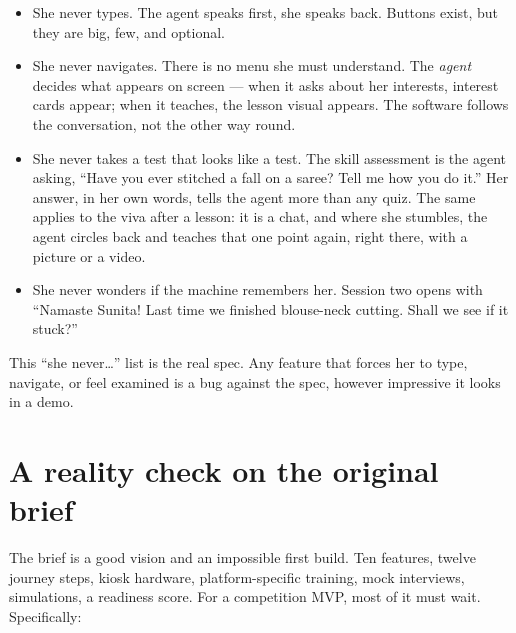 \documentclass[11pt]{article}
\begin{document}
\begin{itemize}
  \item She never types. The agent speaks first, she speaks back. Buttons exist, but they are big, few, and optional.
  \item She never navigates. There is no menu she must understand. The \emph{agent} decides what appears on screen --- when it asks about her interests, interest cards appear; when it teaches, the lesson visual appears. The software follows the conversation, not the other way round.
  \item She never takes a test that looks like a test. The skill assessment is the agent asking, ``Have you ever stitched a fall on a saree? Tell me how you do it.'' Her answer, in her own words, tells the agent more than any quiz. The same applies to the viva after a lesson: it is a chat, and where she stumbles, the agent circles back and teaches that one point again, right there, with a picture or a video.
  \item She never wonders if the machine remembers her. Session two opens with ``Namaste Sunita! Last time we finished blouse-neck cutting. Shall we see if it stuck?''
\end{itemize}

This ``she never\ldots'' list is the real spec. Any feature that forces her to type, navigate, or feel examined is a bug against the spec, however impressive it looks in a demo.

\section{A reality check on the original brief}

The brief is a good vision and an impossible first build. Ten features, twelve journey steps, kiosk hardware, platform-specific training, mock interviews, simulations, a readiness score. For a competition MVP, most of it must wait. Specifically:
\end{document}
